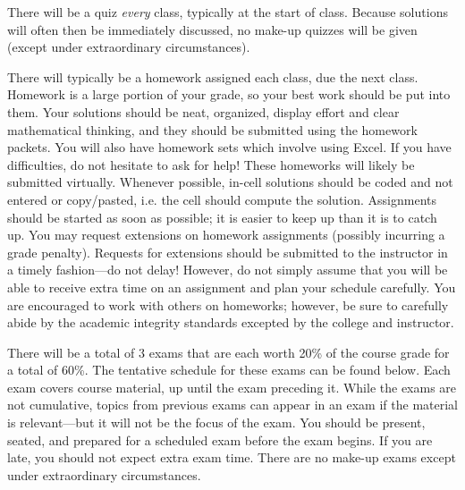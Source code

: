 \documentclass[11pt,letterpaper]{article}
\begin{document}
There will be a quiz \textit{every} class, typically at the start of class. Because solutions will often then be immediately discussed, no make-up quizzes will be given (except under extraordinary circumstances). \pspace


There will typically be a homework assigned each class, due the next class. Homework is a large portion of your grade, so your best work should be put into them. Your solutions should be neat, organized, display effort and clear mathematical thinking, and they should be submitted using the homework packets. You will also have homework sets which involve using Excel. If you have difficulties, do not hesitate to ask for help! These homeworks will likely be submitted virtually. Whenever possible, in-cell solutions should be coded and not entered or copy/pasted, i.e. the cell should compute the solution. Assignments should be started as soon as possible; it is easier to keep up than it is to catch up. You may request extensions on homework assignments (possibly incurring a grade penalty). Requests for extensions should be submitted to the instructor in a timely fashion---do not delay! However, do not simply assume that you will be able to receive extra time on an assignment and plan your schedule carefully. You are encouraged to work with others on homeworks; however, be sure to carefully abide by the academic integrity standards excepted by the college and instructor. \pspace


There will be a total of 3 exams that are each worth 20\% of the course grade for a total of 60\%. The tentative schedule for these exams can be found below. Each exam covers course material, up until the exam preceding it. While the exams are not cumulative, topics from previous exams can appear in an exam if the material is relevant---but it will not be the focus of the exam. You should be present, seated, and prepared for a scheduled exam before the exam begins. If you are late, you should not expect extra exam time. There are no make-up exams except under extraordinary circumstances. \pspace
\end{document}
